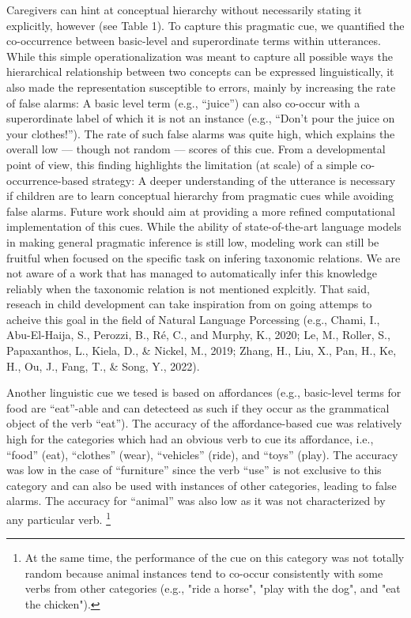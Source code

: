 \documentclass[english,,man]{apa6}
\let\rmarkdownfootnote\footnote%
\def\footnote{\protect\rmarkdownfootnote}
\begin{document}
Caregivers can hint at conceptual hierarchy without necessarily stating it explicitly, however (see Table 1). To capture this pragmatic cue, we quantified the co-occurrence between basic-level and superordinate terms within utterances. While this simple operationalization was meant to capture all possible ways the hierarchical relationship between two concepts can be expressed linguistically, it also made the representation susceptible to errors, mainly by increasing the rate of false alarms: A basic level term (e.g., \enquote{juice}) can also co-occur with a superordinate label of which it is not an instance (e.g., \enquote{Don't pour the juice on your clothes!}). The rate of such false alarms was quite high, which explains the overall low --- though not random --- scores of this cue. From a developmental point of view, this finding highlights the limitation (at scale) of a simple co-occurrence-based strategy: A deeper understanding of the utterance is necessary if children are to learn conceptual hierarchy from pragmatic cues while avoiding false alarms. Future work should aim at providing a more refined computational implementation of this cues. While the ability of state-of-the-art language models in making general pragmatic inference is still low, modeling work can still be fruitful when focused on the specific task on infering taxonomic relations. We are not aware of a work that has managed to automatically infer this knowledge reliably when the taxonomic relation is not mentioned explcitly. That said, reseach in child development can take inspiration from on going attemps to acheive this goal in the field of Natural Language Porcessing (e.g., Chami, I., Abu-El-Haija, S., Perozzi, B., Ré, C., and Murphy, K., 2020; Le, M., Roller, S., Papaxanthos, L., Kiela, D., \& Nickel, M., 2019; Zhang, H., Liu, X., Pan, H., Ke, H., Ou, J., Fang, T., \& Song, Y., 2022).

Another linguistic cue we tesed is based on affordances (e.g., basic-level terms for food are \enquote{eat}-able and can detecteed as such if they occur as the grammatical object of the verb \enquote{eat}). The accuracy of the affordance-based cue was relatively high for the categories which had an obvious verb to cue its affordance, i.e., \enquote{food} (eat), \enquote{clothes} (wear), \enquote{vehicles} (ride), and \enquote{toys} (play). The accuracy was low in the case of \enquote{furniture} since the verb \enquote{use} is not exclusive to this category and can also be used with instances of other categories, leading to false alarms. The accuracy for \enquote{animal} was also low as it was not characterized by any particular verb. \footnote{At the same time, the performance of the cue on this category was not totally random because animal instances tend to co-occur consistently with some verbs from other categories (e.g., "ride a horse", "play with the dog", and "eat the chicken").}
\end{document}
